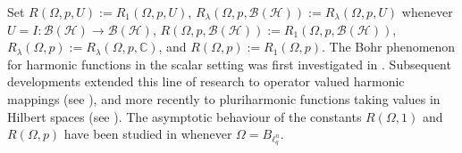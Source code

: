 \documentclass[a4paper,11pt, reqno]{amsart}
\theoremstyle{definition}
\begin{document}
\noindent Set $R(\Omega, p,U):=R_{1}(\Omega, p,U)$, $R_{\lambda}(\Omega, p,\mathcal{B}(\mathcal{H})):=R_{\lambda}(\Omega, p,U)$ whenever $U=I:\mathcal{B}(\mathcal{H})\rightarrow \mathcal{B}(\mathcal{H})$, $R(\Omega, p,\mathcal{B}(\mathcal{H})):=R_{1}(\Omega, p,\mathcal{B}(\mathcal{H}))$, $R_{\lambda}(\Omega, p):=R_{\lambda}(\Omega, p,\mathbb{C})$, and $R(\Omega,p):=R_1(\Omega,p)$. The Bohr phenomenon for harmonic functions in the scalar setting was first investigated in \cite{Abu-2010}. Subsequent developments extended this line of research to operator valued harmonic mappings (see \cite{bhowmik-2021}), and more recently to pluriharmonic functions taking values in Hilbert spaces (see \cite{hamada-Math-Nachr-2023}). The asymptotic behaviour of the constants $R(\Omega,1)$ and $R(\Omega,p)$ have been studied in \cite{hamada-JFA-2022,das-2024} whenever $\Omega=B_{\ell^n _q}$.
\vspace{2mm}
\end{document}
